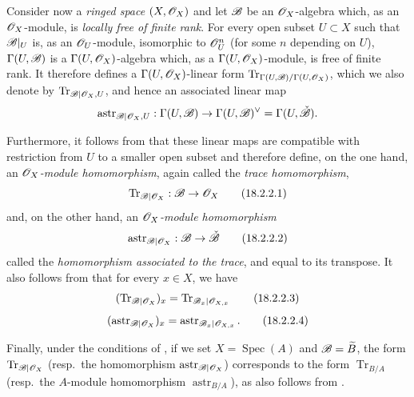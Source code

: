 \begin{env}[18.2.2]
\label{IV.18.2.2}
Consider now a \emph{ringed space} $(X,\mathscr{O}_X)$ and let $\mathscr{B}$ be an $\mathscr{O}_X$-algebra which, as an $\mathscr{O}_X$-module, is \emph{locally free of finite rank}.  For every open subset $U\subset X$ such that $\mathscr{B}|_U$ is, as an $\mathscr{O}_U$-module, isomorphic to $\mathscr{O}_U^n$ (for some $n$ depending on $U$), $\Gamma(U,\mathscr{B})$ is a $\Gamma(U,\mathscr{O}_X)$-algebra which, as a $\Gamma(U,\mathscr{O}_X)$-module, is free of finite rank.  It therefore defines a $\Gamma(U,\mathscr{O}_X)$-linear form $\operatorname{Tr}_{\Gamma(U,\mathscr{B})/\Gamma(U,\mathscr{O}_X)}$, which we also denote by $\operatorname{Tr}_{\mathscr{B}|\mathscr{O}_X,U}$, and hence an associated linear map
\[
\operatorname{astr}_{\mathscr{B}|\mathscr{O}_X,U}:\Gamma(U,\mathscr{B})\to\Gamma(U,\mathscr{B})^\vee=\Gamma(U,\check{\mathscr{B}}).
\]

Furthermore, it follows from  that these linear maps are compatible with restriction from $U$ to a smaller open subset and therefore define, on the one hand, an \emph{$\mathscr{O}_X$-module homomorphism}, again called the \emph{trace homomorphism},
\[
\label{IV.18.2.2.1}
\operatorname{Tr}_{\mathscr{B}|\mathscr{O}_X}:\mathscr{B}\to\mathscr{O}_X
\tag{18.2.2.1}
\]
and, on the other hand, an \emph{$\mathscr{O}_X$-module homomorphism}
\[
\label{IV.18.2.2.2}
\operatorname{astr}_{\mathscr{B}|\mathscr{O}_X}:\mathscr{B}\to\check{\mathscr{B}}
\tag{18.2.2.2}
\]
called the \emph{homomorphism associated to the trace}, and equal to its transpose.
It also follows from  that for every $x\in X$, we have
\[
\label{IV.18.2.2.3}
(\operatorname{Tr}_{\mathscr{B}|\mathscr{O}_X})_x=\operatorname{Tr}_{\mathscr{B}_x|\mathscr{O}_{X,x}}
\tag{18.2.2.3}
\]
\[
\label{IV.18.2.2.4}
(\operatorname{astr}_{\mathscr{B}|\mathscr{O}_X})_x=\operatorname{astr}_{\mathscr{B}_x|\mathscr{O}_{X,x}}.
\tag{18.2.2.4}
\]

Finally, under the conditions of , if we set $X=\operatorname{Spec}(A)$ and $\mathscr{B}=\widetilde{B}$, the form $\operatorname{Tr}_{\mathscr{B}|\mathscr{O}_X}$ (resp.\ the homomorphism $\operatorname{astr}_{\mathscr{B}|\mathscr{O}_X}$) corresponds to the form $\operatorname{Tr}_{B/A}$ (resp.\ the $A$-module homomorphism $\operatorname{astr}_{B/A}$), as also follows from .
\end{env}

